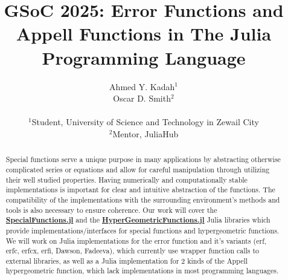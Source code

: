 \documentclass{article}
\title{GSoC 2025: Error Functions and Appell Functions in The Julia Programming Language}
\author{Ahmed Y. Kadah$^1$  
\\Oscar D. Smith$^2$ 
\\\\$^1$Student, University of Science and Technology in Zewail City
\\ $^2$Mentor, JuliaHub}
\date{}
\theoremstyle{mytheoremstyle}
\theoremstyle{mytheoremstyle}
\theoremstyle{myproblemstyle}
\begin{document}
    \maketitle


  \begin{abstract}
    Special functions serve a unique purpose in many applications by abstracting otherwise complicated series or equations and allow for careful manipulation through utilizing their well studied properties. 
    Having numerically and computationally stable implementations is important for clear and intuitive abstraction of the functions.
    The compatibility of the implementations with the surrounding environment's methods and tools is also necessary to ensure coherence.
    Our work will cover the \href{https://github.com/JuliaMath/SpecialFunctions.jl}{\textbf{SpecialFunctions.jl}} and the \href{https://github.com/JuliaMath/HypergeometricFunctions.jl/issues}{\textbf{HyperGeometricFunctions.jl}} Julia libraries which provide implementations/interfaces for special functions and hypergeometric functions.
    We will work on Julia implementations for the error function and it's variants (erf, erfc, erfcx, erfi, Dawson, Fadeeva), which currently use wrapper function calls to external libraries,  as well as a Julia implementation for 2 kinds of the Appell hypergeometric function, which lack implementations in most programming languages.
  \end{abstract}
\end{document}
